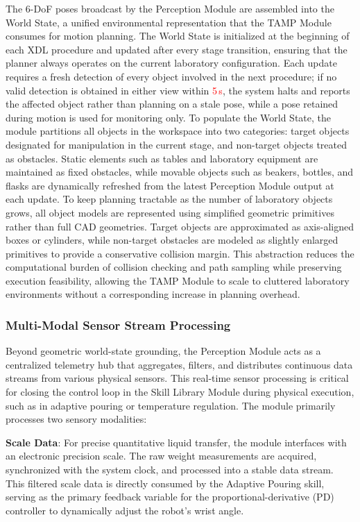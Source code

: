 \documentclass{ieeeaccess}
\newif\ifhighlight
\newcommand{\rev}[1]{\ifhighlight\hl{#1}\else#1\fi}
\newcommand{\nd}[1]{\textcolor{red}{#1}}
\begin{document}
The 6-DoF poses broadcast by the Perception Module are assembled into the World State, a unified environmental representation that the TAMP Module consumes for motion planning. The World State is initialized at the beginning of each XDL procedure and updated after every stage transition, ensuring that the planner always operates on the current laboratory configuration.
\rev{Each update requires a fresh detection of every object involved in the next procedure; if no valid detection is obtained in either view within \nd{5\,s}, the system halts and reports the affected object rather than planning on a stale pose, while a pose retained during motion is used for monitoring only.} To populate the World State, the module partitions all objects in the workspace into two categories: target objects designated for manipulation in the current stage, and non-target objects treated as obstacles. Static elements such as tables and laboratory equipment are maintained as fixed obstacles, while movable objects such as beakers, bottles, and flasks are dynamically refreshed from the latest Perception Module output at each update. To keep planning tractable as the number of laboratory objects grows, all object models are represented using simplified geometric primitives rather than full CAD geometries. Target objects are approximated as axis-aligned boxes or cylinders, while non-target obstacles are modeled as slightly enlarged primitives to provide a conservative collision margin. This abstraction reduces the computational burden of collision checking and path sampling while preserving execution feasibility, allowing the TAMP Module to scale to cluttered laboratory environments without a corresponding increase in planning overhead.


\subsubsection{Multi-Modal Sensor Stream Processing}\label{sec:3.3.3}

Beyond geometric world-state grounding, the Perception Module acts as a centralized telemetry hub that aggregates, filters, and distributes continuous data streams from various physical sensors. This real-time sensor processing is critical for closing the control loop in the Skill Library Module during physical execution, such as in adaptive pouring or temperature regulation. The module primarily processes two sensory modalities:

\textbf{Scale Data}: For precise quantitative liquid transfer, the module interfaces with an electronic precision scale. The raw weight measurements are acquired, synchronized with the system clock, and processed into a stable data stream. This filtered scale data is directly consumed by the Adaptive Pouring skill, serving as the primary feedback variable for the proportional-derivative (PD) controller to dynamically adjust the robot's wrist angle.
\end{document}
